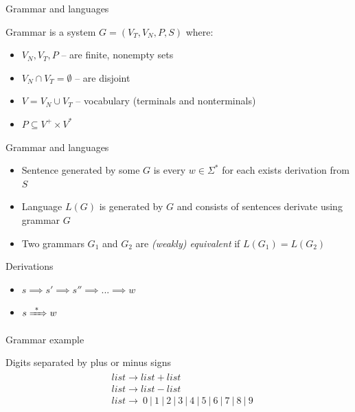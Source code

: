 \documentclass{beamer}
\begin{document}
\begin{frame}{Grammar and languages}

\begin{definition}{Grammar}
	is a system $G = (V_T, V_N, P, S)$ where:
	\begin{itemize}
		\item $V_N, V_T, P$ -- are finite, nonempty sets
		\item $V_N \cap V_T = \emptyset$ -- are disjoint
		\item $V = V_N \cup V_T$ -- vocabulary (terminals and nonterminals)
		\item $P \subseteq V^{+} \times V^{\ast}$
	\end{itemize}
\end{definition}

\begin{block}{Grammar and languages}
\begin{itemize}
	\item Sentence generated by some $G$ is every $w\in \Sigma^{\ast}$ for each exists derivation from $S$
	\item Language $L(G)$ is generated by $G$ and consists of sentences derivate using grammar $G$
	\item Two grammars $G_1$ and $G_2$ are \textit{(weakly) equivalent} if $L(G_1) = L(G_2)$
\end{itemize}
\end{block}

 \end{frame}
 
 \begin{frame}{Derivations}
 	\begin{itemize}
 		\item $s \implies s' \implies s'' \implies ... \implies w$
 		\item $s \xRightarrow{\ * \ } w$
 	\end{itemize}
 \end{frame}

\begin{frame}{Grammar example}
\begin{examples}{Digits separated by plus or minus signs}
\begin{eqnarray*}
\begin{aligned}
& list \rightarrow list + list \\
& list \rightarrow list - list \\
& list \rightarrow \ 0 \ | \ 1 \ | \ 2 \ | \ 3 \ | \ 4 \ | \ 5 \ | \ 6 \ | \ 7 \ | \ 8 \ | \ 9
\end{aligned}
\end{eqnarray*}
\end{examples}
\end{frame}
\end{document}
